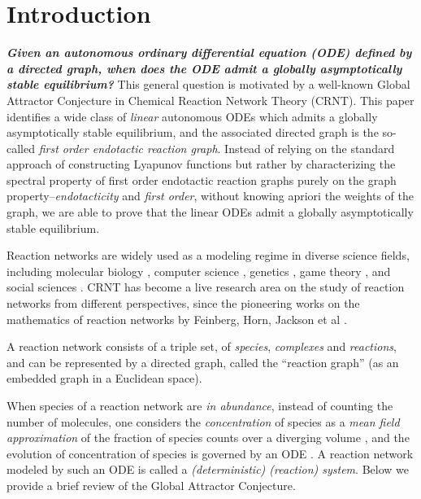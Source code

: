 \documentclass[10pt]{amsart}
\newcounter{tmp}
\numberwithin{equation}{section}
\theoremstyle{plain}
\theoremstyle{definition}
\theoremstyle{remark}
\begin{document}
\maketitle

\section{Introduction}

\begingroup
\setcounter{tmp}{\value{theorem}}%
\setcounter{theorem}{0} %
\renewcommand\thetheorem{\Alph{theorem}}%

{\emph{\textbf{Given an autonomous ordinary differential equation (ODE) defined by a directed graph, when does the ODE admit a globally asymptotically stable equilibrium?}} {This general question is motivated by a well-known Global Attractor Conjecture in Chemical Reaction Network Theory (CRNT). This paper identifies a wide class of \emph{linear} autonomous ODEs which admits a globally asymptotically stable equilibrium, and the associated directed graph is the so-called \emph{first order 
endotactic reaction graph}. Instead of relying on the standard approach of constructing Lyapunov functions but rather by characterizing the spectral property of first order endotactic reaction graphs purely on the graph property\---\emph{endotacticity} and \emph{first order}, without knowing apriori the weights of the graph, we are able to prove that the linear ODEs admit a globally asymptotically stable equilibrium.}

 Reaction networks are widely used as a modeling regime in diverse science fields, including molecular biology \cite{G03}, computer science \cite{SCWB08},  genetics \cite{B45}, game theory \cite{VRDF14}, and social sciences \cite{DW05}. CRNT has become a live research area on the study of reaction networks from different perspectives, since the pioneering works on the mathematics of reaction networks by Feinberg, Horn, Jackson et al \cite{F72,H72,HJ72,CF05}. 
 
 A reaction network consists of a triple set, of \emph{species}, \emph{complexes} and \emph{reactions}, and can be represented by a directed graph, called the ``reaction graph''  (as an embedded graph in a Euclidean space).} 
{When species of a reaction network are \emph{in abundance}, instead of counting the number of molecules, one considers the \emph{concentration} of species as a \emph{mean field approximation} of the fraction of species counts over a diverging volume  \cite{K70,K71}, and the evolution of concentration of species is governed by an ODE \cite{F19}. A reaction network modeled by such an ODE is called a \emph{(deterministic) (reaction) system}.} Below we provide a brief review of the Global Attractor Conjecture.
\smallskip
\end{document}
